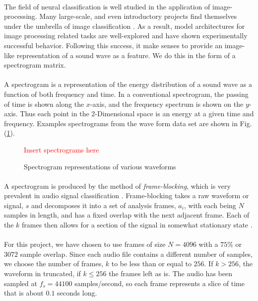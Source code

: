 \documentclass[12pt,letterpaper]{article}
\begin{document}
\paragraph*{}The field of neural classification is well studied in the application of image-processing. Many large-scale, and even introductory projects find themselves under the umbrella of image classification \cite{Geron,Goodfellow,Loy,Mierswa}. As a result, model architectures for image processing related tasks are well-explored and have shown experimentally successful behavior. Following this success, it make senses to provide an image-like representation of a sound wave as a feature. We do this in the form of a spectrogram matrix.

\paragraph*{}A spectrogram is a representation of the energy distribution of a sound wave as a function of both frequency and time. In a conventional spectrogram, the passing of time is shown along the $x$-axis, and the frequency spectrum is shown on the $y$-axis. Thus each point in the 2-Dimensional space is an energy at a given time and frequency. Examples spectrograms from the wave form data set are shown in Fig. (\ref{fig-spectrograms}).

\begin{figure}[H]
\begin{center}
\label{fig-spectrograms}
\textcolor{red}{Insert spectrograms here}
\caption{Spectrogram representations of various waveforms}
\end{center}
\end{figure}

\paragraph*{}A spectrogram is produced by the method of \textit{frame-blocking}, which is very prevalent in audio signal classification \cite{Liu,Zhang}. Frame-blocking takes a raw waveform or signal, $s$ and decomposes it into a set of analysis frames, $a_i$, with each being $N$ samples in length, and has a fixed overlap with the next adjacent frame. Each of the $k$ frames then allows for a section of the signal in somewhat stationary state \cite{Kahn,Virtanen}. 

\paragraph*{}For this project, we have chosen to use frames of size $N = 4096$ with a $75\%$ or $3072$ sample overlap. Since each audio file contains a different number of samples, we choose the number of frames, $k$ to be less than or equal to $256$. If $k > 256$, the waveform in truncated, if $k \leq 256$ the frames left as is. The audio has been sampled at $f_s = 44100$ samples/second, so each frame represents a slice of time that is about $0.1$ seconds long.
\end{document}
